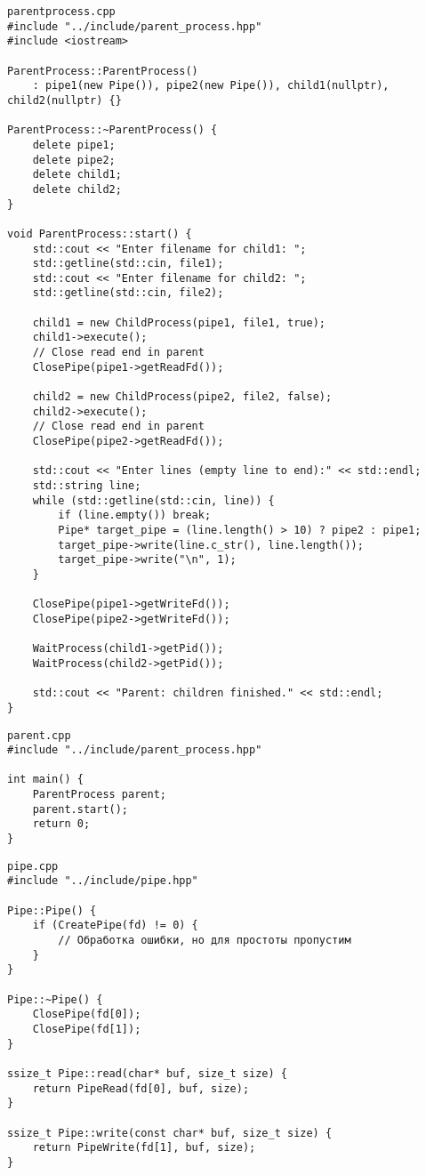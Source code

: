 \begin{verbatim}
parentprocess.cpp
#include "../include/parent_process.hpp"
#include <iostream>

ParentProcess::ParentProcess() 
    : pipe1(new Pipe()), pipe2(new Pipe()), child1(nullptr), child2(nullptr) {}

ParentProcess::~ParentProcess() {
    delete pipe1;
    delete pipe2;
    delete child1;
    delete child2;
}

void ParentProcess::start() {
    std::cout << "Enter filename for child1: ";
    std::getline(std::cin, file1);
    std::cout << "Enter filename for child2: ";
    std::getline(std::cin, file2);

    child1 = new ChildProcess(pipe1, file1, true);
    child1->execute();
    // Close read end in parent
    ClosePipe(pipe1->getReadFd());

    child2 = new ChildProcess(pipe2, file2, false);
    child2->execute();
    // Close read end in parent
    ClosePipe(pipe2->getReadFd());

    std::cout << "Enter lines (empty line to end):" << std::endl;
    std::string line;
    while (std::getline(std::cin, line)) {
        if (line.empty()) break;
        Pipe* target_pipe = (line.length() > 10) ? pipe2 : pipe1;
        target_pipe->write(line.c_str(), line.length());
        target_pipe->write("\n", 1); 
    }

    ClosePipe(pipe1->getWriteFd());
    ClosePipe(pipe2->getWriteFd());

    WaitProcess(child1->getPid());
    WaitProcess(child2->getPid());

    std::cout << "Parent: children finished." << std::endl;
}
\end{verbatim}

\begin{verbatim}
parent.cpp
#include "../include/parent_process.hpp"

int main() {
    ParentProcess parent;
    parent.start();
    return 0;
}
\end{verbatim}

\begin{verbatim}
pipe.cpp
#include "../include/pipe.hpp"

Pipe::Pipe() {
    if (CreatePipe(fd) != 0) {
        // Обработка ошибки, но для простоты пропустим
    }
}

Pipe::~Pipe() {
    ClosePipe(fd[0]);
    ClosePipe(fd[1]);
}

ssize_t Pipe::read(char* buf, size_t size) {
    return PipeRead(fd[0], buf, size);
}

ssize_t Pipe::write(const char* buf, size_t size) {
    return PipeWrite(fd[1], buf, size);
}
\end{verbatim}

